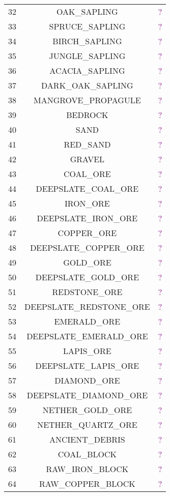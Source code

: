 \documentclass[11pt]{article}
\newcommand\myworries[1]{\textcolor{purple}{#1}}
\begin{document}
\begin{longtable}{ |c|c|c| }
	32 & OAK\_SAPLING & \myworries{?} \\
	33 & SPRUCE\_SAPLING & \myworries{?} \\
	34 & BIRCH\_SAPLING & \myworries{?} \\
	35 & JUNGLE\_SAPLING & \myworries{?} \\
	36 & ACACIA\_SAPLING & \myworries{?} \\
	37 & DARK\_OAK\_SAPLING & \myworries{?} \\
	38 & MANGROVE\_PROPAGULE & \myworries{?} \\
	39 & BEDROCK & \myworries{?} \\
	40 & SAND & \myworries{?} \\
	41 & RED\_SAND & \myworries{?} \\
	42 & GRAVEL & \myworries{?} \\
	43 & COAL\_ORE & \myworries{?} \\
	44 & DEEPSLATE\_COAL\_ORE & \myworries{?} \\
	45 & IRON\_ORE & \myworries{?} \\
	46 & DEEPSLATE\_IRON\_ORE & \myworries{?} \\
	47 & COPPER\_ORE & \myworries{?} \\
	48 & DEEPSLATE\_COPPER\_ORE & \myworries{?} \\
	49 & GOLD\_ORE & \myworries{?} \\
	50 & DEEPSLATE\_GOLD\_ORE & \myworries{?} \\
	51 & REDSTONE\_ORE & \myworries{?} \\
	52 & DEEPSLATE\_REDSTONE\_ORE & \myworries{?} \\
	53 & EMERALD\_ORE & \myworries{?} \\
	54 & DEEPSLATE\_EMERALD\_ORE & \myworries{?} \\
	55 & LAPIS\_ORE & \myworries{?} \\
	56 & DEEPSLATE\_LAPIS\_ORE & \myworries{?} \\
	57 & DIAMOND\_ORE & \myworries{?} \\
	58 & DEEPSLATE\_DIAMOND\_ORE & \myworries{?} \\
	59 & NETHER\_GOLD\_ORE & \myworries{?} \\
	60 & NETHER\_QUARTZ\_ORE & \myworries{?} \\
	61 & ANCIENT\_DEBRIS & \myworries{?} \\
	62 & COAL\_BLOCK & \myworries{?} \\
	63 & RAW\_IRON\_BLOCK & \myworries{?} \\
	64 & RAW\_COPPER\_BLOCK & \myworries{?} \\

\end{longtable}
\end{document}
